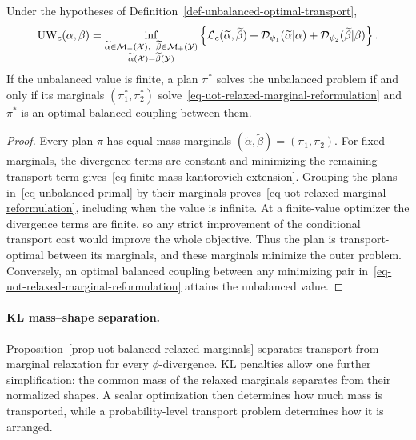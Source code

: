\begin{prop}\label{prop-uot-balanced-relaxed-marginals}
	Under the hypotheses of Definition~\ref{def-unbalanced-optimal-transport},
	\begin{equation}\label{eq-uot-relaxed-marginal-reformulation}
		\UW_c(\alpha,\beta)
		=
		\inf_{\substack{\widetilde\alpha\in\Mm_+(\Xx),\ \,\widetilde\beta\in\Mm_+(\Yy)\\
			\widetilde\alpha(\Xx)=\widetilde\beta(\Yy)}}
		\left\{
			\MK_c(\widetilde\alpha,\widetilde\beta)
			+\Dd_{\psi_1}(\widetilde\alpha|\alpha)
			+\Dd_{\psi_2}(\widetilde\beta|\beta)
		\right\}.
	\end{equation}
	If the unbalanced value is finite, a plan $\pi^*$ solves the unbalanced problem if and only if its marginals $(\pi_1^*,\pi_2^*)$ solve~\eqref{eq-uot-relaxed-marginal-reformulation} and $\pi^*$ is an optimal balanced coupling between them.
\end{prop}

\begin{proof}
	Every plan $\pi$ has equal-mass marginals $(\widetilde\alpha,\widetilde\beta)=(\pi_1,\pi_2)$. For fixed marginals, the divergence terms are constant and minimizing the remaining transport term gives~\eqref{eq-finite-mass-kantorovich-extension}. Grouping the plans in~\eqref{eq-unbalanced-primal} by their marginals proves~\eqref{eq-uot-relaxed-marginal-reformulation}, including when the value is infinite. At a finite-value optimizer the divergence terms are finite, so any strict improvement of the conditional transport cost would improve the whole objective. Thus the plan is transport-optimal between its marginals, and these marginals minimize the outer problem. Conversely, an optimal balanced coupling between any minimizing pair in~\eqref{eq-uot-relaxed-marginal-reformulation} attains the unbalanced value.
\end{proof}

\paragraph{KL mass--shape separation.}

Proposition~\ref{prop-uot-balanced-relaxed-marginals} separates transport from marginal relaxation for every $\phi$-divergence. KL penalties allow one further simplification: the common mass of the relaxed marginals separates from their normalized shapes. A scalar optimization then determines how much mass is transported, while a probability-level transport problem determines how it is arranged.

